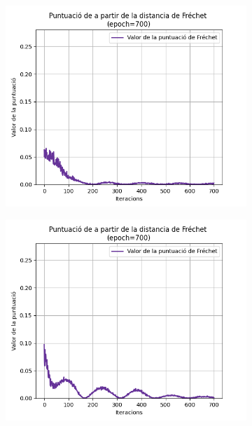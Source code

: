 \begin{figure}
	\begin{subfigure}[b]{.32\linewidth}
		\includegraphics[width=\linewidth]{figures/data/FD_score_4.png}
		\caption{}
	\end{subfigure}
	\begin{subfigure}[b]{.32\linewidth}
		\includegraphics[width=\linewidth]{figures/data/FD_score_5.png}
		\caption{}
	\end{subfigure}
	\begin{subfigure}[b]{.32\linewidth}

\end{subfigure}
\end{figure}
